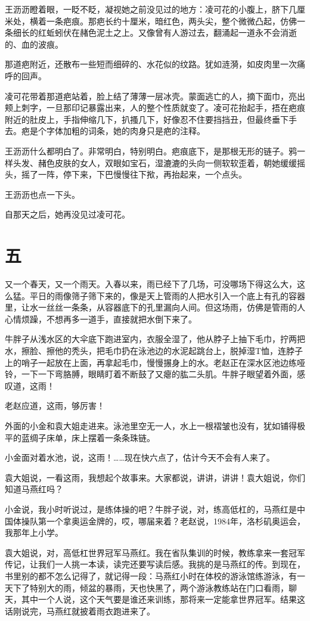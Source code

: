 \documentclass[lang=cn,newtx,12pt,scheme=chinese]{elegantbook}
\begin{document}
王沥沥瞪着眼，一眨不眨，凝视她之前没见过的地方：凌可花的小腹上，脐下几厘米处，横着一条疤痕。那疤长约十厘米，暗红色，两头尖，整个微微凸起，仿佛一条细长的红蚯蚓伏在赭色泥土之上。又像曾有人游过去，翻涌起一道永不会消逝的、血的波痕。

那道疤附近，还散布一些短而细碎的、水花似的纹路。犹如涟漪，如皮肉里一次痛呼的回声。

凌可花带着那道疤站着，脸上结了薄薄一层冰壳。蒙面逃亡的人，摘下面巾，亮出颊上刺字，一旦那印记暴露出来，人的整个性质就变了。凌可花抬起手，捂在疤痕附近的肚皮上，手指伸缩几下，扒搔几下，好像忍不住要挡挡丑，但最终垂下手去。疤是个字体加粗的词条，她的肉身只是疤的注释。

王沥沥什么都明白了。非常明白，特别明白。疤痕底下，是那根无形的链子。鸦一样头发、赭色皮肤的女人，双眼如宝石，湿漉漉的头向一侧软软歪着，朝她缓缓摇头，摇了一阵，停下来，下巴慢慢往下揿，再抬起来，一个点头。

王沥沥也点一下头。

自那天之后，她再没见过凌可花。
\section{五}
又一个春天，又一个雨天。入春以来，雨已经下了几场，可没哪场下得这么大，这么猛。平日的雨像筛子筛下来的，像是天上管雨的人把水引入一个底上有孔的容器里，让水一丝丝一条条，从容器底下的孔里漏向人间。但这场雨，仿佛是管雨的人心情烦躁，不想再多一道手，直接就把水倒下来了。

牛胖子从浅水区的大伞底下跑进室内，衣服全湿了，他从脖子上抽下毛巾，拧两把水，擦脸、擦他的秃头，把毛巾扔在泳池边的水泥起跳台上，脱掉湿T恤，连脖子上的哨子一起放在上面，再拿起毛巾，慢慢搌身上的水。老赵正在深水区池边练哑铃，一下一下弯胳膊，眼睛盯着不断鼓了又瘪的肱二头肌。牛胖子眼望着外面，感叹道，这雨！

老赵应道，这雨，够厉害！

外面的小金和袁大姐走进来。泳池里空无一人，水上一根褶皱也没有，犹如铺得极平的蓝绸子床单，床上摆着一条条珠链。

小金面对着水池，说，这雨！……现在快六点了，估计今天不会有人来了。

袁大姐说，一看这雨，我想起个故事来。大家都说，讲讲，讲讲！袁大姐说，你们知道马燕红吗？

小金说，我小时听说过，是练体操的吧？牛胖子说，对，练高低杠的，马燕红是中国体操队第一个拿奥运金牌的，哎，哪届来着？老赵说，1984年，洛杉矶奥运会，我那年上小学。

袁大姐说，对，高低杠世界冠军马燕红。我在省队集训的时候，教练拿来一套冠军传记，让我们一人挑一本读，读完还要写读后感。我挑的是马燕红的传。到现在，书里别的都不怎么记得了，就记得一段：马燕红小时在体校的游泳馆练游泳，有一天下了特别大的雨，倾盆的暴雨，天也快黑了，两个游泳教练站在门口看雨，聊天，其中一个人说，这个天气要是谁还来训练，那将来一定能拿世界冠军。结果这话刚说完，马燕红就披着雨衣跑进来了。
\end{document}
